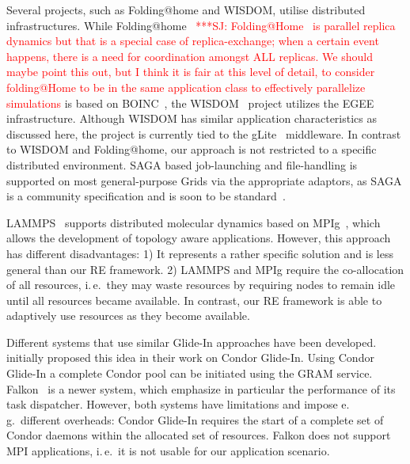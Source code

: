 \documentclass{rspublic}
\newcommand{\jhanote}[1]{ {\textcolor{red} { ***SJ: #1 }}}
\newcommand{\jhanote}[1]{}
\newcommand{\glidein}[1]{Glide-In }
\begin{document}
{
Several projects, such as Folding@home and WISDOM, utilise distributed
infrastructures. While
Folding@home~\citep{PhysRevLett.86.4983}\jhanote{Folding@Home~\citep{PhysRevLett.86.4983}
is parallel replica dynamics but that is a special case of
replica-exchange; when a certain event happens, there is a need for
coordination amongst ALL replicas. We should maybe point this out,
but I think it is fair at this level of detail, to consider
folding@Home to be in the same application class to effectively
parallelize simulations} is based on BOINC~\citep{1033223}, the
WISDOM~\citep{wisdom} project utilizes the EGEE infrastructure. 
Although WISDOM has similar application characteristics as discussed
here, the project is currently tied to the gLite~\citep{glite}
middleware.  In contrast to WISDOM and Folding@home, our approach is
not restricted to a specific distributed environment. SAGA based
job-launching and file-handling is supported on most general-purpose
Grids via the appropriate adaptors, as SAGA is a community
specification and is soon to be standard~\citep{saga_url}.       

LAMMPS~\citep{Plimpton:1995nx,1383459} supports distributed molecular
dynamics based on MPIg~\citep{Toonen:2008ao}, which allows the
development of topology aware applications. However, this approach has
different disadvantages: 1) It represents a rather specific solution
and is less general than our RE framework. 2) LAMMPS and MPIg require
the co-allocation of all resources, i.\,e.\ they may waste resources
by requiring nodes to remain idle until all resources became
available.  In contrast, our RE framework is able to adaptively use
resources as they become available.

Different systems that use similar Glide-In approaches have been
developed. \citet{citeulike:291860} initially proposed this idea in
their work on Condor Glide-In. Using Condor Glide-In a complete Condor
pool can be initiated using the GRAM service. Falkon~\citep{1362680}
is a newer system, which emphasize in particular the performance of
its task dispatcher.  However, both systems have limitations and
impose e.\,g.\ different overheads: Condor \glidein\ requires the
start of a complete set of Condor daemons within the allocated set of
resources. 
Falkon  does not support MPI applications, i.\,e.\ it is not usable for our
application scenario.  

}
\end{document}

